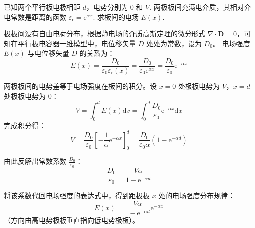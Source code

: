 \begin{exercise}\label{ex:16.6}
已知两个平行板电极相距 $d$，电势分别为 $0$ 和 $V$. 两极板间充满电介质，其相对介电常数是距离的函数 $\varepsilon_{\mathrm{r}} = \mathrm{e}^{\alpha x}$. 求板间的电场 $E(x)$.
\end{exercise}
\begin{solution}
极板间没有自由电荷分布，根据静电场的介质高斯定理的微分形式 $\nabla \cdot \boldsymbol{D} = 0$，可知在平行板电容器一维模型中，电位移矢量 $D$ 处处为常数，设为 $D_0$。
电场强度 $E(x)$ 与电位移矢量 $D$ 的关系为：
$$ E(x) = \frac{D_0}{\varepsilon_0 \varepsilon_{\mathrm{r}}(x)} = \frac{D_0}{\varepsilon_0 \mathrm{e}^{\alpha x}} = \frac{D_0}{\varepsilon_0} \mathrm{e}^{-\alpha x} $$

两极板间的电势差等于电场强度在板间的积分。设 $x=0$ 处极板电势为 $V$，$x=d$ 处极板电势为 $0$：
$$ V = \int_0^d E(x) \mathrm{d}x = \int_0^d \frac{D_0}{\varepsilon_0} \mathrm{e}^{-\alpha x} \mathrm{d}x $$
完成积分得：
$$ V = \frac{D_0}{\varepsilon_0} \left[ -\frac{1}{\alpha} \mathrm{e}^{-\alpha x} \right]_0^d = \frac{D_0}{\varepsilon_0 \alpha} \left( 1 - \mathrm{e}^{-\alpha d} \right) $$

由此反解出常数系数 $\frac{D_0}{\varepsilon_0}$：
$$ \frac{D_0}{\varepsilon_0} = \frac{V \alpha}{1 - \mathrm{e}^{-\alpha d}} $$

将该系数代回电场强度的表达式中，得到距极板 $x$ 处的电场强度分布规律：
$$ E(x) = \frac{V \alpha}{1 - \mathrm{e}^{-\alpha d}} \mathrm{e}^{-\alpha x} $$
（方向由高电势极板垂直指向低电势极板）。
\end{solution}


